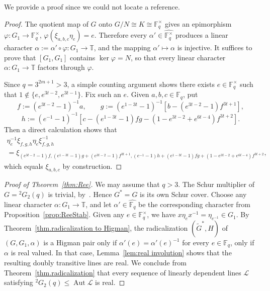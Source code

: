 \documentclass[11pt]{article}
\theoremstyle{definition}
\numberwithin{equation}{section}
\begin{document}
We provide a proof since we could not locate a reference.

\begin{proof}
The quotient map of $G$ onto $G/N \cong K \cong \mathbb{F}_q^\times$ gives an epimorphism $\varphi \colon G_1 \to \mathbb{F}_q^\times$, $\varphi(\xi_{a,b,c} \eta_e) = e$.
Therefore every $\alpha' \in \widehat{ \mathbb{F}_q^\times }$ produces a linear character $\alpha := \alpha' \circ \varphi \colon G_1 \to \mathbb{T}$, and the mapping $\alpha' \mapsto \alpha$ is injective.
It suffices to prove that $[G_1,G_1]$ contains $\ker \varphi = N$, so that every linear character $\alpha \colon G_1 \to \mathbb{T}$ factors through $\varphi$.


Since $q = 3^{2m+1} > 3$, a simple counting argument shows there exists $e \in \mathbb{F}_q^\times$ such that $1 \notin \{e,e^{3t-2},e^{3t-1}\}$.
Fix such an $e$.
Given $a,b,c \in \mathbb{F}_q$, put
\[
f := (e^{3t-2} - 1)^{-1} a,
\qquad
g := (e^{1-3t} - 1)^{-1}[ b - (e^{3t-2} - 1)f^{3t+1} ],
\]
\[
h := (e^{-1} - 1)^{-1} [ c - (e^{1-3t} - 1)fg - (1 - e^{3t-2} + e^{6t-4})f^{3t+2} ].
\]
Then a direct calculation shows that
\begin{multline*}
\eta_e^{-1} \xi_{f,g,h} \eta_e \xi_{f,g,h}^{-1} \\
=
\xi_{
(e^{3t-2}  - 1)f,
(e^{1-3t} - 1)g + (e^{3t-2} - 1)f^{3t+1},
(e^{-1} - 1)h + (e^{1-3t} - 1)fg + (1-e^{3t-2} + e^{6t-4})f^{3t+2}
},
\end{multline*}
which equals $\xi_{a,b,c}$ by construction.
\end{proof}

\begin{proof}[Proof of Theorem~\ref{thm:Ree}]
We may assume that $q>3$.
The Schur multiplier of $G= {}^2G_2(q)$ is trivial, by~\cite[Theorem~1]{AlperinGorenstein:66}.
Hence $G^*=G$ is its own Schur cover.
Choose any linear character $\alpha \colon G_1 \to \mathbb{T}$, and let $\alpha' \in \widehat{ \mathbb{F}_q }$ be the corresponding character from Proposition~\ref{prop:ReeStab}.
Given any $e \in \mathbb{F}_q^\times$, we have $x\eta_e x^{-1} = \eta_{e^{-1}} \in G_1$.
By Theorem~\ref{thm.radicalization to Higman}, the radicalization $(\widetilde{G}^*,H)$ of $(G,G_1,\alpha)$ is a Higman pair only if $\alpha'(e) = \alpha'(e)^{-1}$ for every $e \in \mathbb{F}_q$, only if $\alpha$ is real valued.
In that case, Lemma~\ref{lem:real involution} shows that the resulting doubly transitive lines are real.
We conclude from Theorem~\ref{thm.radicalization} that every sequence of linearly dependent lines $\mathscr{L}$ satisfying ${}^2G_2(q) \leq \operatorname{Aut}\mathscr{L}$ is real.
\end{proof}
\end{document}
